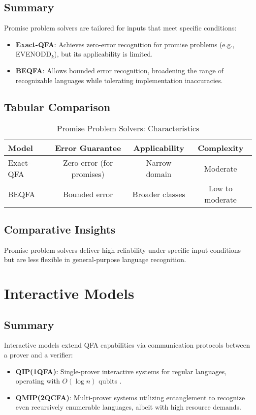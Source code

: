 \subsection{Summary}
Promise problem solvers are tailored for inputs that meet specific conditions:
\begin{itemize}
    \item \textbf{Exact-QFA}: Achieves zero-error recognition for promise problems (e.g., EVENODD$_k$), but its applicability is limited.
    \item \textbf{BEQFA}: Allows bounded error recognition, broadening the range of recognizable languages while tolerating implementation inaccuracies.
\end{itemize}

\subsection{Tabular Comparison}
\begin{table}[ht]
\centering
\caption{Promise Problem Solvers: Characteristics}
\label{tab:promise}
\begin{tabular}{|l|c|c|c|}
\hline
\textbf{Model} & \textbf{Error Guarantee} & \textbf{Applicability} & \textbf{Complexity} \\ \hline
Exact-QFA & Zero error (for promises) & Narrow domain & Moderate \\ \hline
BEQFA    & Bounded error & Broader classes & Low to moderate \\ \hline
\end{tabular}
\end{table}

\subsection{Comparative Insights}
Promise problem solvers deliver high reliability under specific input conditions but are less flexible in general-purpose language recognition.

\section{Interactive Models}

\subsection{Summary}
Interactive models extend QFA capabilities via communication protocols between a prover and a verifier:
\begin{itemize}
    \item \textbf{QIP(1QFA)}: Single-prover interactive systems for regular languages, operating with $O(\log n)$ qubits \cite{yakaryilmaz2013verification}.
    \item \textbf{QMIP(2QCFA)}: Multi-prover systems utilizing entanglement to recognize even recursively enumerable languages, albeit with high resource demands.
\end{itemize}

